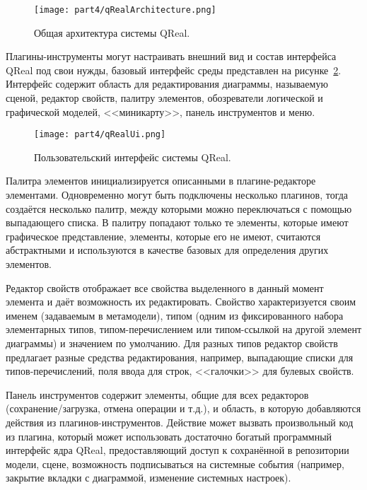 \begin{figure} [ht]
	\begin{center}
		\texttt{[image: part4/qRealArchitecture.png]}
		\caption{Общая архитектура системы QReal.}
		\label{qRealArchitecture}
	\end{center}
\end{figure}

Плагины-инструменты могут настраивать внешний вид и состав интерфейса QReal под свои 
нужды, базовый интерфейс среды представлен на рисунке~\ref{qRealUi}. Интерфейс содержит 
область для редактирования диаграммы, называемую сценой, редактор свойств, палитру 
элементов, обозреватели логической и графической моделей, <<миникарту>>, панель инструментов и меню.

\begin{figure} [ht]
	\begin{center}
		\texttt{[image: part4/qRealUi.png]}
		\caption{Пользовательский интерфейс системы QReal.}
		\label{qRealUi}
	\end{center}
\end{figure}

Палитра элементов инициализируется описанными в плагине-редакторе элементами. Одновременно 
могут быть подключены несколько плагинов, тогда создаётся  несколько палитр, между 
которыми можно переключаться с помощью выпадающего списка. В палитру попадают только 
те элементы, которые имеют графическое представление, элементы, которые его не имеют, 
считаются абстрактными и используются в качестве базовых для определения других элементов.

Редактор свойств отображает все свойства выделенного в данный момент элемента и даёт 
возможность их редактировать. Свойство характеризуется своим именем (задаваемым в метамодели), 
типом (одним из фиксированного набора элементарных типов, типом-перечислением или 
типом-ссылкой на другой элемент диаграммы) и значением по умолчанию. Для разных типов 
редактор свойств предлагает разные средства редактирования, например, выпадающие списки 
для типов-перечислений, поля ввода для строк, <<галочки>> для булевых свойств.

Панель инструментов содержит элементы, общие для всех редакторов (сохранение/загрузка, 
отмена операции и т.д.), и область, в которую добавляются действия из плагинов-инструментов. 
Действие может вызвать произвольный код из плагина, который может использовать достаточно 
богатый программный интерфейс ядра QReal, предоставляющий доступ к сохранённой в репозитории 
модели, сцене, возможность подписываться на системные события (например, закрытие вкладки 
с диаграммой, изменение системных настроек).

